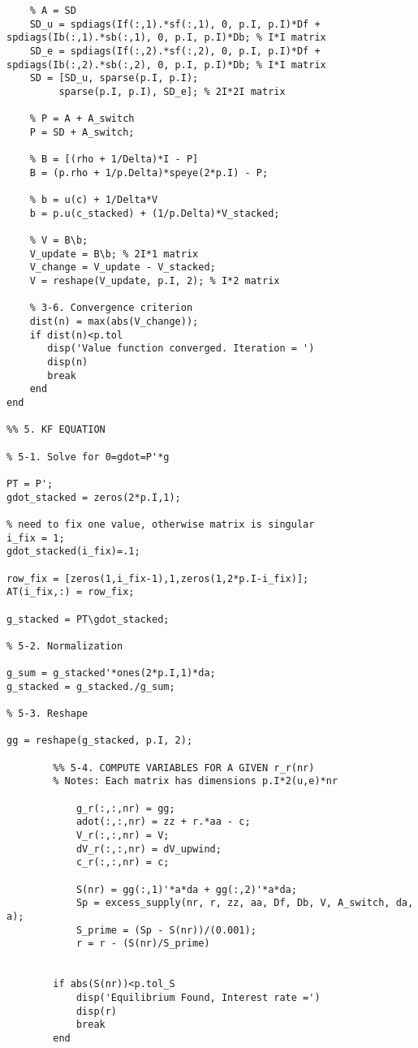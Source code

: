 \begin{lstlisting}
    % A = SD
    SD_u = spdiags(If(:,1).*sf(:,1), 0, p.I, p.I)*Df + spdiags(Ib(:,1).*sb(:,1), 0, p.I, p.I)*Db; % I*I matrix
    SD_e = spdiags(If(:,2).*sf(:,2), 0, p.I, p.I)*Df + spdiags(Ib(:,2).*sb(:,2), 0, p.I, p.I)*Db; % I*I matrix
    SD = [SD_u, sparse(p.I, p.I);
         sparse(p.I, p.I), SD_e]; % 2I*2I matrix
   
    % P = A + A_switch
    P = SD + A_switch;

    % B = [(rho + 1/Delta)*I - P]
    B = (p.rho + 1/p.Delta)*speye(2*p.I) - P; 

    % b = u(c) + 1/Delta*V
    b = p.u(c_stacked) + (1/p.Delta)*V_stacked;

    % V = B\b;
    V_update = B\b; % 2I*1 matrix
    V_change = V_update - V_stacked;
    V = reshape(V_update, p.I, 2); % I*2 matrix

    % 3-6. Convergence criterion
    dist(n) = max(abs(V_change));
    if dist(n)<p.tol
       disp('Value function converged. Iteration = ')
       disp(n)
       break
    end
end

%% 5. KF EQUATION

% 5-1. Solve for 0=gdot=P'*g

PT = P';
gdot_stacked = zeros(2*p.I,1);

% need to fix one value, otherwise matrix is singular
i_fix = 1;
gdot_stacked(i_fix)=.1;

row_fix = [zeros(1,i_fix-1),1,zeros(1,2*p.I-i_fix)];
AT(i_fix,:) = row_fix;

g_stacked = PT\gdot_stacked; 

% 5-2. Normalization

g_sum = g_stacked'*ones(2*p.I,1)*da;
g_stacked = g_stacked./g_sum;

% 5-3. Reshape

gg = reshape(g_stacked, p.I, 2);

        %% 5-4. COMPUTE VARIABLES FOR A GIVEN r_r(nr)
        % Notes: Each matrix has dimensions p.I*2(u,e)*nr
        
            g_r(:,:,nr) = gg;
            adot(:,:,nr) = zz + r.*aa - c;
            V_r(:,:,nr) = V;
            dV_r(:,:,nr) = dV_upwind;
            c_r(:,:,nr) = c;
            
            S(nr) = gg(:,1)'*a*da + gg(:,2)'*a*da;
            Sp = excess_supply(nr, r, zz, aa, Df, Db, V, A_switch, da, a);
            S_prime = (Sp - S(nr))/(0.001);
            r = r - (S(nr)/S_prime)
            

        if abs(S(nr))<p.tol_S
            disp('Equilibrium Found, Interest rate =')
            disp(r)
            break
        end


\end{lstlisting}
